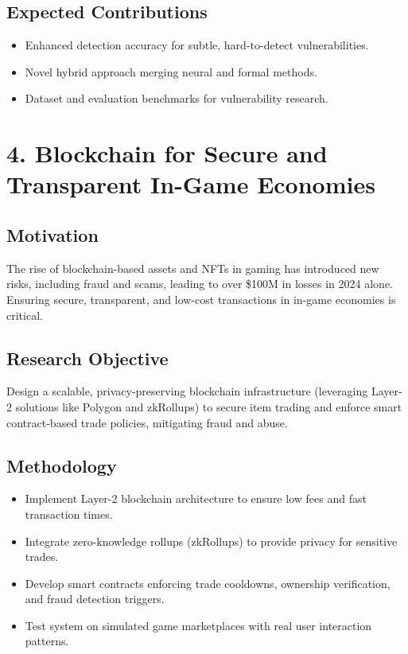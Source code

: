 \documentclass[11pt]{article}
\begin{document}
\subsection{Expected Contributions}
\label{sec:org577e1cb}
\begin{itemize}
\item Enhanced detection accuracy for subtle, hard-to-detect vulnerabilities.
\item Novel hybrid approach merging neural and formal methods.
\item Dataset and evaluation benchmarks for vulnerability research.
\end{itemize}
\section{4. Blockchain for Secure and Transparent In-Game Economies}
\label{sec:orgee93ab5}
\subsection{Motivation}
\label{sec:orgd8b5d4c}
The rise of blockchain-based assets and NFTs in gaming has introduced new risks, including fraud and scams, leading to over \$100M in losses in 2024 alone. Ensuring secure, transparent, and low-cost transactions in in-game economies is critical.
\subsection{Research Objective}
\label{sec:orgc106b38}
Design a scalable, privacy-preserving blockchain infrastructure (leveraging Layer-2 solutions like Polygon and zkRollups) to secure item trading and enforce smart contract-based trade policies, mitigating fraud and abuse.
\subsection{Methodology}
\label{sec:org1cd0808}
\begin{itemize}
\item Implement Layer-2 blockchain architecture to ensure low fees and fast transaction times.
\item Integrate zero-knowledge rollups (zkRollups) to provide privacy for sensitive trades.
\item Develop smart contracts enforcing trade cooldowns, ownership verification, and fraud detection triggers.
\item Test system on simulated game marketplaces with real user interaction patterns.
\end{itemize}
\end{document}
